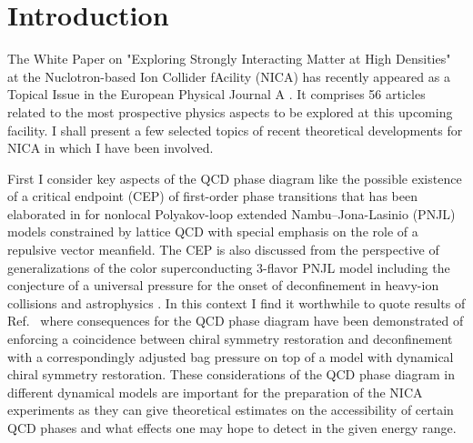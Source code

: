 \documentclass{webofc}
\begin{document}
\section{Introduction}
\label{intro}
The White Paper on "Exploring Strongly Interacting Matter at High Densities" at the Nuclotron-based Ion Collider fAcility (NICA) has recently appeared as a Topical Issue in the European Physical Journal A \cite{1}. 
It comprises 56 articles related to the most prospective physics aspects to be explored at this upcoming facility. 
I shall present a few selected topics of recent theoretical developments for NICA in which I have been involved.

	First I consider key aspects of the QCD phase diagram like the possible existence of a critical endpoint (CEP) of first-order phase transitions that has been elaborated in \cite{7} for nonlocal 
Polyakov-loop extended Nambu--Jona-Lasinio (PNJL) models constrained by lattice QCD with special emphasis on the role of a repulsive vector meanfield.
	The CEP is also discussed from the perspective of generalizations of the color superconducting 
3-flavor PNJL model \cite{8} including the conjecture of a universal pressure for the onset of deconfinement  in heavy-ion collisions and astrophysics \cite{9}.
	In this context I find it worthwhile to quote results of Ref.~\cite{Fischer:2016ojn} where consequences for the QCD phase diagram have been demonstrated of enforcing a coincidence between chiral symmetry restoration and deconfinement with a correspondingly adjusted bag pressure on top of a model with dynamical chiral symmetry restoration.
These considerations of the QCD phase diagram in different dynamical models are important for the preparation of the NICA experiments as they can give theoretical estimates on the accessibility of certain QCD phases and what effects one may hope to detect in the given energy range.
  
\end{document}
